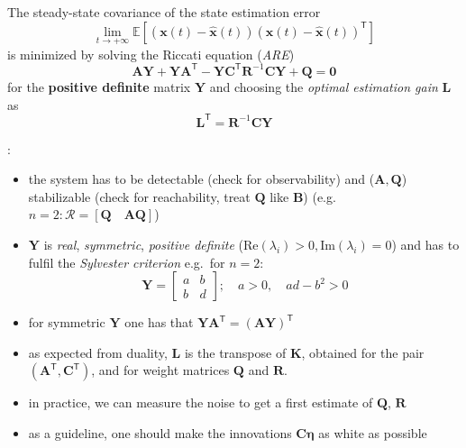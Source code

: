 
The steady-state covariance of the state estimation error
\begin{equation*}
    \lim_{t\to+\infty}\mathbb{E}\left[(\mathbf{x}(t)-\hat{\mathbf{x}}(t)){(\mathbf{x}(t)-\hat{\mathbf{x}}(t))}^{\mathsf{T}}\right]
\end{equation*}
is minimized by solving the Riccati equation (\textit{ARE})
\begin{equation*}
    \mathbf{AY}+\mathbf{YA}^{\mathsf{T}}-\mathbf{YC}^{\mathsf{T}} \mathbf{R}^{-1}\mathbf{CY}+\mathbf{Q}=\mathbf{0}
\end{equation*}
for the \textbf{positive definite} matrix $\mathbf{Y}$ and choosing the \textit{optimal estimation gain} $\mathbf{L}$ as
\begin{equation*}
    \mathbf{L}^{\mathsf{T}}=\mathbf{R}^{-1}\mathbf{CY}
\end{equation*}

:

\begin{itemize}
    \item the system has to be detectable (check for observability) and ($\mathbf{A,Q}$) stabilizable (check for reachability, treat $\mathbf{Q}$ like $\mathbf{B}$)\newline
          (e.g. $n=2: \mathbf{\mathcal{R}}= \left[\mathbf{Q}\quad \mathbf{AQ}\right]$)
    \item $\mathbf{Y}$ is \textit{real}, \textit{symmetric}, \textit{positive definite} ($\mathrm{Re}(\lambda_i) > 0, \mathrm{Im}(\lambda_i) = 0$) and has to fulfil the \textit{Sylvester criterion} e.g.\ for $n=2$:
          \noindent\begin{equation*}
              \mathbf{Y}=\begin{bmatrix}
                  a & b \\
                  b & d
              \end{bmatrix}; \quad a>0, \quad ad-b^2>0
          \end{equation*}
    \item for symmetric $\mathbf{Y}$ one has that $\mathbf{Y}\mathbf{A}^{\mathsf{T}}={(\mathbf{AY})}^{\mathsf{T}}$
    \item as expected from duality, $\mathbf{L}$ is the transpose of $\mathbf{K}$, obtained for the pair $(\mathbf{A}^{\mathsf{T}}, \mathbf{C}^{\mathsf{T}})$, and for weight matrices $\mathbf{Q}$ and $\mathbf{R}$.
    \item in practice, we can measure the noise to get a first estimate of $\mathbf{Q}$, $\mathbf{R}$
    \item as a guideline, one should make the innovations $\mathbf{C}\boldsymbol{\eta}$ as white as possible
\end{itemize}
